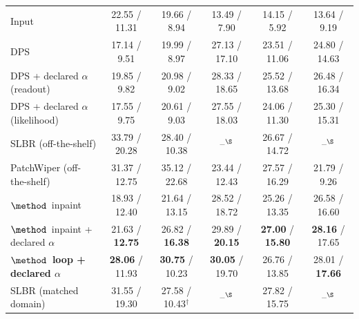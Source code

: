 \begin{table}[t]
\begin{tabular}{@{}lccccc@{}}
    Input
    & 22.55 / 11.31
    & 19.66 / 8.94
    & 13.49 / 7.90
    & 14.15 / 5.92
    & 13.64 / 9.19 \\

    DPS
    & 17.14 / 9.51
    & 19.99 / 8.97
    & 27.13 / 17.10
    & 23.51 / 11.06
    & 24.80 / 14.63 \\

    DPS + declared $\alpha$ (readout)
    & 19.85 / 9.82
    & 20.98 / 9.02
    & 28.33 / 18.65
    & 25.52 / 13.68
    & 26.48 / 16.34 \\

    DPS + declared $\alpha$ (likelihood)
    & 17.55 / 9.75
    & 20.61 / 9.03
    & 27.55 / 18.03
    & 24.06 / 11.30
    & 25.30 / 15.31 \\

    SLBR (off-the-shelf)
    & 33.79 / 20.28
    & 28.40 / 10.38
    & --$^\S$
    & 26.67 / 14.72
    & --$^\S$ \\

    PatchWiper (off-the-shelf)
    & 31.37 / 12.75
    & 35.12 / 22.68
    & 23.44 / 12.43
    & 27.57 / 16.29
    & 21.79 / 9.26 \\

    \midrule

    $\method$\ inpaint
    & 18.93 / 12.40
    & 21.64 / 13.15
    & 28.52 / 18.72
    & 25.26 / 13.35
    & 26.58 / 16.60 \\

    $\method$\ inpaint + declared $\alpha$
    & 21.63 / \textbf{12.75}
    & 26.82 / \textbf{16.38}
    & 29.89 / \textbf{20.15}
    & \textbf{27.00} / \textbf{15.80}
    & \textbf{28.16} / 17.65 \\

    \textbf{$\method$\ loop + declared $\alpha$}
    & \textbf{28.06} / 11.93
    & \textbf{30.75} / 10.23
    & \textbf{30.05} / 19.70
    & 26.76 / 13.85
    & 28.01 / \textbf{17.66} \\

    \midrule

    SLBR (matched domain)
    & 31.55 / 19.30
    & 27.58 / 10.43$^\dagger$
    & --$^\S$
    & 27.82 / 15.75
    & --$^\S$ \\

    \bottomrule
\end{tabular}
\end{table}
